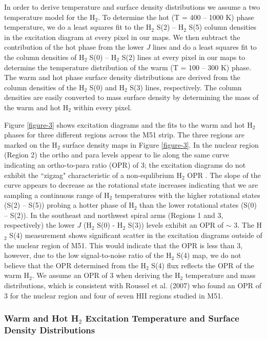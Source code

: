 \documentclass[12pt,preprint]{aastex}
\begin{document}
In order to derive temperature and surface density 
distributions we assume a two temperature model for the 
H$_2$.  To determine the hot (T = 400 -- 1000 K) 
phase temperature, we do a least squares fit 
to the H$_2$ S(2) -- H$_2$ S(5) column densities in the 
excitation diagram at every pixel in our maps.   
We then subtract the contribution of the hot phase from the lower $J$ 
lines and do a least squares fit to the column densities of 
H$_2$ S(0) -- H$_2$ S(2) lines at every pixel in our 
maps to determine the temperature distribution 
of the warm (T = 100 -- 300 K) phase.  The warm and hot 
phase surface density distributions are derived from the 
column densities of the H$_2$ S(0) and H$_2$ S(3) lines, 
respectively.  The column densities are easily converted 
to mass surface density by determining the mass of the 
warm and hot H$_2$ within every pixel. 

Figure \ref{figure-3} shows excitation diagrams and the 
fits to the warm and hot H$_2$ phases for three
different regions across the M51 strip.  The three 
regions are marked on the H$_2$ surface density 
maps in Figure \ref{figure-3}.  In the nuclear region 
(Region 2) the ortho and para levels appear to lie along the 
same curve indicating an ortho-to-para ratio (OPR) of 3; 
the excitation diagrams do not exhibit the ``zigzag" characteristic of a 
non-equlibrium H$_2$ OPR \citep{neu98, fue99}.  The 
slope of the curve appears to decrease as the rotational 
state increases indicating that we are sampling a continuous 
range of H$_2$ temperatures with the higher rotational 
states (S(2) -- S(5)) probing a hotter phase of H$_2$ 
than the lower rotational states (S(0) -- S(2)).  In the 
southeast and northwest spiral arms (Regions 1 and 
3, respectively) the lower $J$ (H$_2$ S(0) - 
H$_2$ S(3)) levels exhibit an OPR of $\sim$ 3.  The 
H$_2$ S(4) measurement shows significant 
scatter in the excitation diagrams outside of the nuclear 
region of M51.  This would indicate that the OPR is 
less than 3, however, due to the low signal-to-noise 
ratio of the H$_2$ S(4) map, we do not 
believe that the OPR determined from the H$_2$ 
S(4) flux reflects the OPR of the warm H$_2$. 
We assume an OPR of 3 when deriving the H$_2$ 
temperature and mass distributions, which is consistent 
with Roussel et al. (2007) who found an OPR of 3  for the 
nuclear region and four of seven HII regions studied in M51.

\subsubsection{Warm and Hot H$_2$ Excitation Temperature and Surface Density Distributions}
\end{document}
